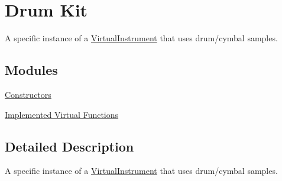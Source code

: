 \hypertarget{group___doc_drum}{}\section{Drum Kit}
\label{group___doc_drum}


A specific instance of a \hyperlink{class_virtual_instrument}{Virtual\+Instrument} that uses drum/cymbal samples.  


\subsection*{Modules}
\begin{DoxyCompactItemize}
\item 
\hyperlink{group___drum_construct}{Constructors}
\item 
\hyperlink{group___drum_virt_func}{Implemented Virtual Functions}
\end{DoxyCompactItemize}


\subsection{Detailed Description}
A specific instance of a \hyperlink{class_virtual_instrument}{Virtual\+Instrument} that uses drum/cymbal samples. 

